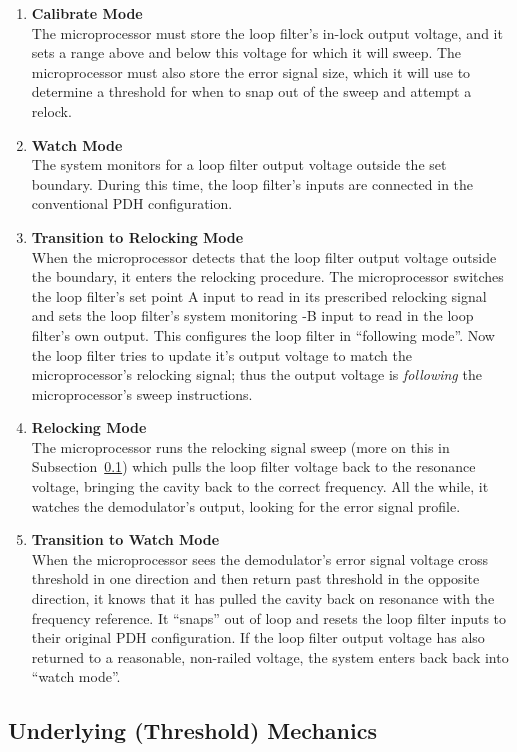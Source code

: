 \documentclass[10pt]{report}
\begin{document}
\begin{enumerate}
	\item{\textbf{Calibrate Mode}}\\The microprocessor must store the loop filter's in-lock output voltage, and it sets a range above and below this voltage for which it will sweep. The microprocessor must also store the error signal size, which it will use to determine a threshold for when to snap out of the sweep and attempt a relock.
	\item{\textbf{Watch Mode}}\\The system monitors for a loop filter output voltage outside the set boundary. During this time, the loop filter's inputs are connected in the conventional PDH configuration.
	\item{\textbf{Transition to Relocking Mode}}\\When the microprocessor detects that the loop filter output voltage outside the boundary, it enters the relocking procedure. The microprocessor switches the loop filter's set point A input to read in its prescribed relocking signal and sets the loop filter's system monitoring -B input to read in the loop filter's own output. This configures the loop filter in ``following mode''. Now the loop filter tries to update it's output voltage to match the microprocessor's relocking signal; thus the output voltage is \textit{following} the microprocessor's sweep instructions.
	\item{\textbf{Relocking Mode}}\\The microprocessor runs the relocking signal sweep (more on this in Subsection~\ref{underlying_mechanics}) which pulls the loop filter voltage back to the resonance voltage, bringing the cavity back to the correct frequency. All the while, it watches the demodulator's output, looking for the error signal profile.
	\item{\textbf{Transition to Watch Mode}}\\When the microprocessor sees the demodulator's error signal voltage cross threshold in one direction and then return past threshold in the opposite direction, it knows that it has pulled the cavity back on resonance with the frequency reference. It ``snaps'' out of loop and resets the loop filter inputs to their original PDH configuration. If the loop filter output voltage has also returned to a reasonable, non-railed voltage, the system enters back back into ``watch mode''.
\end{enumerate}

\subsection{Underlying (Threshold) Mechanics}
\label{underlying_mechanics}
\end{document}
